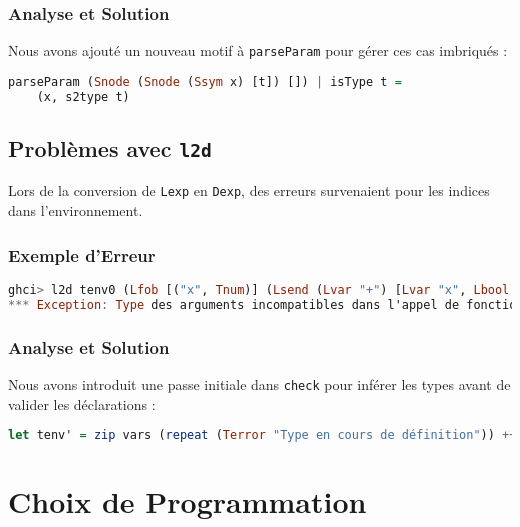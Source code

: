 \documentclass[a4paper,12pt]{article}
\begin{document}
\subsubsection{Analyse et Solution}

Nous avons ajouté un nouveau motif à \texttt{parseParam} pour gérer ces cas imbriqués :

\begin{lstlisting}[language=Haskell, caption={Modification de la fonction \texttt{parseParam}}, label={lst:parseParam}]
parseParam (Snode (Snode (Ssym x) [t]) []) | isType t =
    (x, s2type t)
\end{lstlisting}

\subsection{Problèmes avec \texttt{l2d}}

Lors de la conversion de \texttt{Lexp} en \texttt{Dexp}, des erreurs survenaient pour les indices dans l'environnement.

\subsubsection{Exemple d'Erreur}

\begin{lstlisting}[language=Haskell, caption={Erreur rencontrée lors de la conversion de \texttt{Lexp} en \texttt{Dexp}}, label={lst:l2dError}]
ghci> l2d tenv0 (Lfob [("x", Tnum)] (Lsend (Lvar "+") [Lvar "x", Lbool True]))
*** Exception: Type des arguments incompatibles dans l'appel de fonction
\end{lstlisting}

\subsubsection{Analyse et Solution}

Nous avons introduit une passe initiale dans \texttt{check} pour inférer les types avant de valider les déclarations :

\begin{lstlisting}[language=Haskell, caption={Modification dans \texttt{check}}, label={lst:checkModification}]
let tenv' = zip vars (repeat (Terror "Type en cours de définition")) ++ tenv
\end{lstlisting}

\section{Choix de Programmation}
\end{document}
